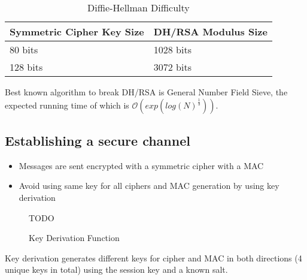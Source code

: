 \documentclass[a4paper]{article}
\begin{document}
\begin{table}[h]
  \centering
  \begin{tabular}{@{}ll@{}}
    \toprule
    Symmetric Cipher Key Size & DH/RSA Modulus Size \\
    \midrule
    80 bits                   & 1028 bits           \\
    128 bits                  & 3072 bits           \\
    \bottomrule
  \end{tabular}
  \caption{Diffie-Hellman Difficulty}
  \label{tab:diffie_hellman_difficulty}
\end{table}
\FloatBarrier

Best known algorithm to break DH/RSA is General Number Field Sieve, the expected
running time of which is $\mathcal{O}(exp(log(N)^{\frac{1}{3}}))$.

\subsection{Establishing a secure channel}

\begin{itemize}
  \item Messages are sent encrypted with a symmetric cipher with a MAC
  \item Avoid using same key for all ciphers and MAC generation by using key
        derivation
\end{itemize}

\begin{figure}[h!]
  \centering
  TODO
  \caption{Key Derivation Function}
  \label{fig:key_derivation_function}
\end{figure}
\FloatBarrier

Key derivation generates different keys for cipher and MAC in both directions (4
unique keys in total) using the session key and a known salt.
\end{document}
